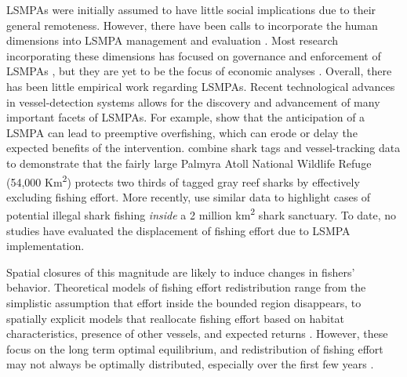 \documentclass[9pttwoside,lineno]{pnas-new}
\begin{document}
LSMPAs were initially assumed to have little social implications due
to their general remoteness. However, there have been calls to incorporate the
human dimensions into LSMPA management and evaluation
\citep{agardy_2011,gray_2017}. Most research incorporating these
dimensions has focused on governance and enforcement of LSMPAs
\cite{alger_2017,christie_2017}, but they are yet to be
the focus of economic analyses \citep{gray_2017}. Overall, there has
been little empirical work regarding LSMPAs. Recent technological
advances in vessel-detection systems allows for the discovery and
advancement of many important facets of LSMPAs. For example,
\cite{mcdermott_2018} show that the anticipation of a LSMPA can lead to
preemptive overfishing, which can erode or delay the expected benefits
of the intervention. \cite{white_2017} combine shark tags and
vessel-tracking data to demonstrate that the fairly large Palmyra Atoll
National Wildlife Refuge (54,000 Km\textsuperscript{2}) protects two
thirds of tagged gray reef sharks by effectively excluding fishing
effort. More recently, \citep{bradley_2018} use similar data to
highlight cases of potential illegal shark fishing \emph{inside} a 2
million km\textsuperscript{2} shark sanctuary. To date, no studies have
evaluated the displacement of fishing effort due to LSMPA
implementation.

Spatial closures of this magnitude are likely to induce changes in
fishers' behavior. Theoretical models of fishing effort redistribution
range from the simplistic assumption that effort inside the bounded
region disappears, to spatially explicit models that reallocate fishing
effort based on habitat characteristics, presence of other vessels, and
expected returns \citep{smith_2003,hilborn_2006}. However, these focus
on the long term optimal equilibrium, and redistribution of fishing
effort may not always be optimally distributed, especially over the first few years
\citep{stevenson_2013}.
\end{document}
